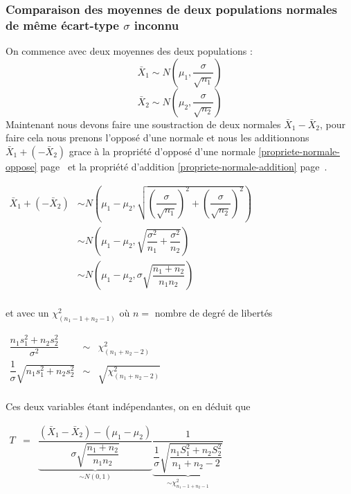 \subsubsection{Comparaison des moyennes de deux populations normales de même écart-type $\sigma$ inconnu}
On commence avec deux moyennes des deux populations :
$$\bar{X}_1 \sim N \left( \mu_1, \dfrac{\sigma}{\sqrt{n_1}} \right)$$
$$\bar{X}_2 \sim N \left( \mu_2, \dfrac{\sigma}{\sqrt{n_2}} \right)$$
Maintenant nous devons faire une soustraction de deux normales $\bar{X}_1 - \bar{X}_2$, pour faire cela nous prenons l'opposé d'une normale et nous les additionnons $\bar{X}_1 + (-\bar{X}_2)$ grace à la propriété d'opposé d'une normale \ref{propriete-normale-oppose} page~\pageref{propriete-normale-oppose} et la propriété d'addition \ref{propriete-normale-addition} page~\pageref{propriete-normale-addition}.
\begin{center}
	$\begin{array}{LL}
		\bar{X}_1 + (-\bar{X}_2) &\sim N \left( \mu_1 - \mu_2, \sqrt{\left(\dfrac{\sigma}{\sqrt{n_1}}\right)^2 + \left(\dfrac{\sigma}{\sqrt{n_2}}\right)^2} \right)\\
				     &\sim N \left( \mu_1 - \mu_2, \sqrt{\dfrac{\sigma^2}{n_1} + \dfrac{\sigma^2}{n_2}} \right)\\
				     &\sim N \left( \mu_1 - \mu_2, \sigma\sqrt{\dfrac{n_1 + n_2}{n_1 n_2}} \right)\\
	\end{array}$
\end{center}
et avec un $\chi^2_{(n_1-1+n_2-1)}$ où $n =$ nombre de degré de libertés
\begin{center}
	$\begin{array}{LCL}
		\dfrac{n_1s_1^2 + n_2s_2^2}{\sigma^2}     &\sim& \chi^2_{(n_1+n_2-2)}\\
		\dfrac{1}{\sigma}\sqrt{n_1s_1^2+n_2s_2^2} &\sim& \sqrt{\chi^2_{(n_1+n_2-2)}}\\
	\end{array}$
\end{center}
Ces deux variables étant indépendantes, on en déduit que
\begin{center}
	$\begin{array}{LCL}
		T &=& \underbrace{\dfrac{(\bar{X}_1 - \bar{X}_2) - (\mu_1 - \mu_2)}{\sigma\sqrt{\dfrac{n_1+n_2}{n_1n_2}}}}_{\displaystyle\sim N(0,1)} \underbrace{\dfrac{1}{\dfrac{1}{\sigma}\sqrt{\dfrac{n_1S^2_1+n_2S_2^2}{n_1+n_2-2}}}}_{\displaystyle\sim\chi_{n_1-1+n_2-1}^2}\\
	\end{array}$
\end{center}
